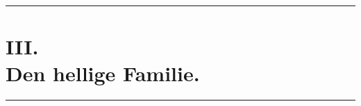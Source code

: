 \documentclass[12pt,a4paper]{book}
\begin{document}
\begin{center}
  \rule{0.38\textwidth}{0.4pt}
\end{center}
%
\section*{III.\\[4pt] Den hellige Familie.}

\begin{center}
  \rule{0.08\textwidth}{0.4pt}
\end{center}
\end{document}
